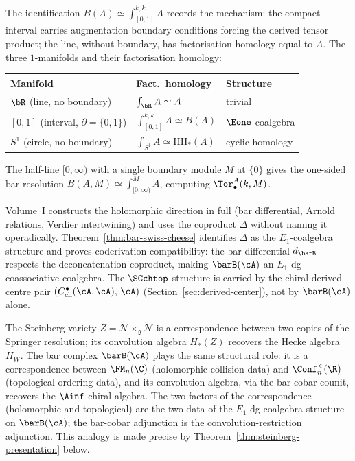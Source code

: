 \begin{remark}
\label{rem:interval-vs-line}
The identification $B(A) \simeq \int_{[0,1]}^{k,k} A$ records the
mechanism: the compact interval carries augmentation boundary
conditions forcing the derived tensor product; the line, without
boundary, has factorisation homology equal to $A$. The three
$1$-manifolds and their factorisation homology:
\begin{center}
\renewcommand{\arraystretch}{1.3}
\begin{tabular}{lll}
\hline
\textbf{Manifold} & \textbf{Fact.\ homology} & \textbf{Structure} \\
\hline
$\bR$ (line, no boundary) & $\int_{\bR} A \simeq A$ & trivial \\
$[0,1]$ (interval, $\partial = \{0,1\}$)
 & $\int_{[0,1]}^{k,k} A \simeq B(A)$
 & $\Eone$ coalgebra \\
$S^1$ (circle, no boundary)
 & $\int_{S^1} A \simeq \mathrm{HH}_\ast(A)$
 & cyclic homology \\
\hline
\end{tabular}
\end{center}
The half-line $[0,\infty)$ with a single boundary module $M$
at $\{0\}$ gives the one-sided bar resolution
$B(A,M) \simeq \int_{[0,\infty)}^{M} A$, computing
$\Tor^A_\bullet(k,M)$.
\end{remark}

\begin{remark}
\label{rem:bar-swiss-cheese-strategy}
Volume~I constructs the holomorphic direction in full (bar
differential, Arnold relations, Verdier intertwining) and uses the
coproduct $\Delta$ without naming it operadically.
Theorem~\ref{thm:bar-swiss-cheese} identifies $\Delta$ as the
$E_1$-coalgebra structure and proves coderivation compatibility:
the bar differential $d_{\barB}$ respects the deconcatenation
coproduct, making $\barB(\cA)$ an $E_1$ dg coassociative coalgebra.
The $\SCchtop$ structure is carried by the chiral derived centre
pair $(C^\bullet_{\mathrm{ch}}(\cA,\cA),\, \cA)$
(Section~\ref{sec:derived-center}), not by $\barB(\cA)$ alone.
\end{remark}

\begin{remark}
\label{rem:steinberg-analogy}
The Steinberg variety
$Z = \widetilde{\mathcal{N}} \times_{\mathfrak{g}}
\widetilde{\mathcal{N}}$ is a correspondence between two copies
of the Springer resolution; its convolution algebra $H_*(Z)$
recovers the Hecke algebra~$H_W$. The bar complex
$\barB(\cA)$ plays the same structural role: it is a
correspondence between $\FM_n(\C)$ (holomorphic collision data)
and $\Conf_n^{<}(\R)$ (topological ordering data), and its
convolution algebra, via the bar-cobar counit, recovers the
$\Ainf$ chiral algebra. The two factors of the correspondence
(holomorphic and topological) are the two data of the $E_1$ dg
coalgebra structure on $\barB(\cA)$; the bar-cobar
adjunction is the convolution-restriction adjunction.
This analogy is made precise by
Theorem~\ref{thm:steinberg-presentation} below.
\end{remark}

